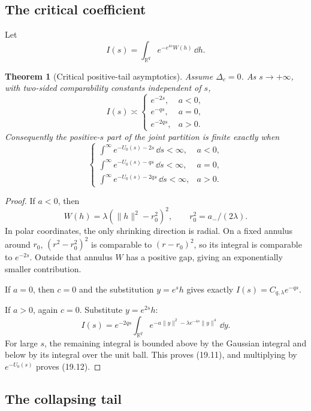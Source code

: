 \documentclass[11pt]{article}
\newtheorem{theorem}{Theorem}[section]
\theoremstyle{remark}
\begin{document}
\subsection{The critical coefficient}

Let
\[
 I(s)=\int_{\mathbb R^q}e^{-e^{4s}W(h)}\,\dd h.    \tag{19.10}
\]

\begin{theorem}[Critical positive-tail asymptotics]
\label{thm:v17v19-critical-tail}
Assume \(\Delta_c=0\).  As \(s\to+\infty\), with two-sided
comparability constants independent of \(s\),
\[
 I(s)\asymp
 \begin{cases}
 e^{-2s},&a<0,\\
 e^{-qs},&a=0,\\
 e^{-2qs},&a>0.
 \end{cases}                                       \tag{19.11}
\]
Consequently the positive-\(s\) part of the joint partition is
finite exactly when
\[
\begin{cases}
\displaystyle\int^\infty e^{-U_0(s)-2s}\,\dd s<\infty,&a<0,\\
\displaystyle\int^\infty e^{-U_0(s)-qs}\,\dd s<\infty,&a=0,\\
\displaystyle\int^\infty e^{-U_0(s)-2qs}\,\dd s<\infty,&a>0.
\end{cases}                                       \tag{19.12}
\]
\end{theorem}

\begin{proof}
If \(a<0\), then
\[
 W(h)=\lambda(\|h\|^2-r_0^2)^2,
 \qquad r_0^2=a_-/(2\lambda).
\]
In polar coordinates, the only shrinking direction is radial.
On a fixed annulus around \(r_0\),
\((r^2-r_0^2)^2\) is comparable to \((r-r_0)^2\), so its integral is
comparable to \(e^{-2s}\).  Outside that annulus \(W\) has a positive
gap, giving an exponentially smaller contribution.

If \(a=0\), then \(c=0\) and the substitution \(y=e^sh\) gives
exactly \(I(s)=C_{q,\lambda}e^{-qs}\).

If \(a>0\), again \(c=0\).  Substitute \(y=e^{2s}h\):
\[
 I(s)=e^{-2qs}\int_{\mathbb R^q}
 e^{-a\|y\|^2-\lambda e^{-4s}\|y\|^4}\,\dd y.
\]
For large \(s\), the remaining integral is bounded above by the
Gaussian integral and below by its integral over the unit ball.
This proves (19.11), and multiplying by \(e^{-U_0(s)}\) proves
(19.12).
\end{proof}

\subsection{The collapsing tail}
\end{document}
